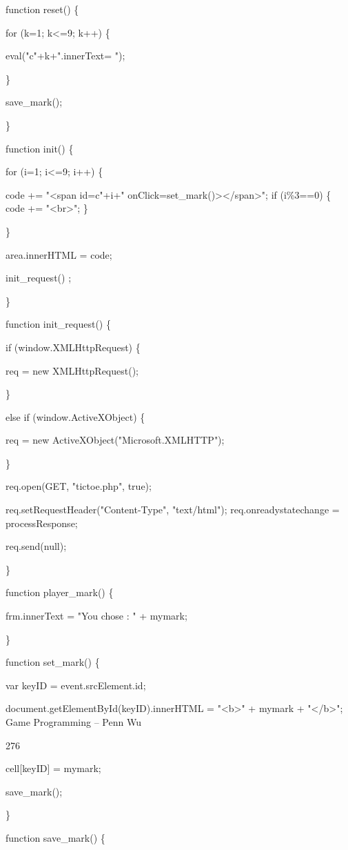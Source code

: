 \documentclass[
]{article}
\begin{document}
function reset() \{

for (k=1; k\textless=9; k++) \{

eval("c"+k+".innerText=\textquotesingle{} \textquotesingle");

\}

save\_mark();

\}

function init() \{

for (i=1; i\textless=9; i++) \{

code += "\textless span id=\textquotesingle c"+i+"\textquotesingle{}
onClick=\textquotesingle set\_mark()\textquotesingle\textgreater\textless/span\textgreater";
if (i\%3==0) \{ code += "\textless br\textgreater"; \}

\}

area.innerHTML = code;

init\_request() ;

\}

function init\_request() \{

if (window.XMLHttpRequest) \{

req = new XMLHttpRequest();

\}

else if (window.ActiveXObject) \{

req = new ActiveXObject("Microsoft.XMLHTTP");

\}

req.open(\textquotesingle GET\textquotesingle, "tictoe.php", true);

req.setRequestHeader("Content-Type", "text/html");
req.onreadystatechange = processResponse;

req.send(null);

\}

function player\_mark() \{

frm.innerText = "You chose : " + mymark;

\}

function set\_mark() \{

var keyID = event.srcElement.id;

document.getElementById(keyID).innerHTML = "\textless b\textgreater" +
mymark + "\textless/b\textgreater"; Game Programming -- Penn Wu

276

\protect\hypertarget{index_split_014.htmlux5cux23p277}{}{}
cell{[}keyID{]} = mymark;

save\_mark();

\}

function save\_mark() \{
\end{document}
